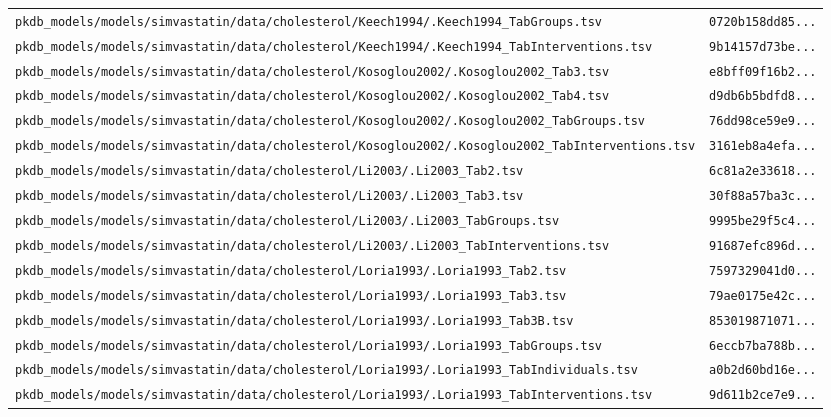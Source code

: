 \begin{longtable}{ll}
\texttt{pkdb\_models/models/simvastatin/data/cholesterol/Keech1994/.Keech1994\_TabGroups.tsv} & \texttt{0720b158dd85...} \\
\texttt{pkdb\_models/models/simvastatin/data/cholesterol/Keech1994/.Keech1994\_TabInterventions.tsv} & \texttt{9b14157d73be...} \\
\texttt{pkdb\_models/models/simvastatin/data/cholesterol/Kosoglou2002/.Kosoglou2002\_Tab3.tsv} & \texttt{e8bff09f16b2...} \\
\texttt{pkdb\_models/models/simvastatin/data/cholesterol/Kosoglou2002/.Kosoglou2002\_Tab4.tsv} & \texttt{d9db6b5bdfd8...} \\
\texttt{pkdb\_models/models/simvastatin/data/cholesterol/Kosoglou2002/.Kosoglou2002\_TabGroups.tsv} & \texttt{76dd98ce59e9...} \\
\texttt{pkdb\_models/models/simvastatin/data/cholesterol/Kosoglou2002/.Kosoglou2002\_TabInterventions.tsv} & \texttt{3161eb8a4efa...} \\
\texttt{pkdb\_models/models/simvastatin/data/cholesterol/Li2003/.Li2003\_Tab2.tsv} & \texttt{6c81a2e33618...} \\
\texttt{pkdb\_models/models/simvastatin/data/cholesterol/Li2003/.Li2003\_Tab3.tsv} & \texttt{30f88a57ba3c...} \\
\texttt{pkdb\_models/models/simvastatin/data/cholesterol/Li2003/.Li2003\_TabGroups.tsv} & \texttt{9995be29f5c4...} \\
\texttt{pkdb\_models/models/simvastatin/data/cholesterol/Li2003/.Li2003\_TabInterventions.tsv} & \texttt{91687efc896d...} \\
\texttt{pkdb\_models/models/simvastatin/data/cholesterol/Loria1993/.Loria1993\_Tab2.tsv} & \texttt{7597329041d0...} \\
\texttt{pkdb\_models/models/simvastatin/data/cholesterol/Loria1993/.Loria1993\_Tab3.tsv} & \texttt{79ae0175e42c...} \\
\texttt{pkdb\_models/models/simvastatin/data/cholesterol/Loria1993/.Loria1993\_Tab3B.tsv} & \texttt{853019871071...} \\
\texttt{pkdb\_models/models/simvastatin/data/cholesterol/Loria1993/.Loria1993\_TabGroups.tsv} & \texttt{6eccb7ba788b...} \\
\texttt{pkdb\_models/models/simvastatin/data/cholesterol/Loria1993/.Loria1993\_TabIndividuals.tsv} & \texttt{a0b2d60bd16e...} \\
\texttt{pkdb\_models/models/simvastatin/data/cholesterol/Loria1993/.Loria1993\_TabInterventions.tsv} & \texttt{9d611b2ce7e9...} \\

\end{longtable}
